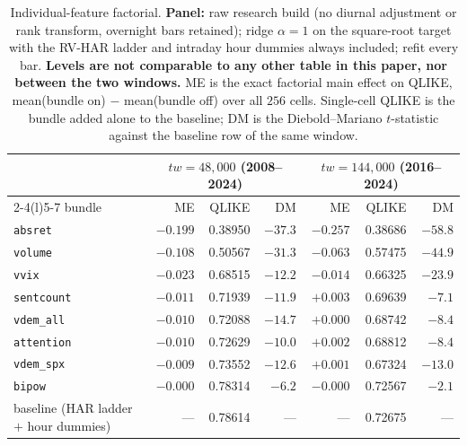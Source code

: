 \begin{table}[H]
\centering
\caption{Individual-feature factorial. \textbf{Panel:} raw research build (no diurnal
adjustment or rank transform, overnight bars retained); ridge $\alpha = 1$ on the
square-root target with the RV-HAR ladder and intraday hour dummies always included;
refit every bar. \textbf{Levels are not comparable to any other table in this paper, nor
between the two windows.} ME is the exact factorial main effect on QLIKE, mean(bundle on)
$-$ mean(bundle off) over all $256$ cells. Single-cell QLIKE is the bundle added alone to
the baseline; DM is the Diebold--Mariano $t$-statistic against the baseline row of the same
window.}
\label{tab:marginal_factorial}
\begin{tabular}{lrrrrrr}
\toprule
& \multicolumn{3}{c}{$tw = 48{,}000$ (2008--2024)} & \multicolumn{3}{c}{$tw = 144{,}000$ (2016--2024)} \\
\cmidrule(lr){2-4}\cmidrule(l){5-7}
bundle & ME & QLIKE & DM & ME & QLIKE & DM \\
\midrule
\texttt{absret}    & $-0.199$ & 0.38950 & $-37.3$ & $-0.257$ & 0.38686 & $-58.8$ \\
\texttt{volume}    & $-0.108$ & 0.50567 & $-31.3$ & $-0.063$ & 0.57475 & $-44.9$ \\
\texttt{vvix}      & $-0.023$ & 0.68515 & $-12.2$ & $-0.014$ & 0.66325 & $-23.9$ \\
\texttt{sentcount} & $-0.011$ & 0.71939 & $-11.9$ & $+0.003$ & 0.69639 & $-7.1$ \\
\texttt{vdem\_all} & $-0.010$ & 0.72088 & $-14.7$ & $+0.000$ & 0.68742 & $-8.4$ \\
\texttt{attention} & $-0.010$ & 0.72629 & $-10.0$ & $+0.002$ & 0.68812 & $-8.4$ \\
\texttt{vdem\_spx} & $-0.009$ & 0.73552 & $-12.6$ & $+0.001$ & 0.67324 & $-13.0$ \\
\texttt{bipow}     & $-0.000$ & 0.78314 & $-6.2$  & $-0.000$ & 0.72567 & $-2.1$ \\
\midrule
baseline (HAR ladder $+$ hour dummies) & --- & 0.78614 & --- & --- & 0.72675 & --- \\
\bottomrule
\end{tabular}
\end{table}

